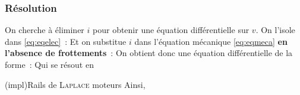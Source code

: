 \documentclass[../../main/main.tex]{subfiles}
\begin{document}
\subsubsection{Résolution}
\label{sssec:rlplmot_resol}
On cherche à éliminer $i$ pour obtenir une équation différentielle sur $v$. On
l'isole dans \eqref{eq:eqelec}~:
\psw{%
	\[
		i = \frac{U_0}{R} - \frac{B \ell }{R}v
	\]
}%
Et on substitue $i$ dans l'équation mécanique \eqref{eq:eqmeca} \textbf{en
	l'absence de frottements}~:
%
On obtient donc une équation différentielle de la forme~:
\psw{%
	\[
		\boxed{\dv{v}{t} + \frac{v}{\tau} = \frac{v\ind{lim}}{\tau}}
		\qav
		\boxed{\tau = \frac{Rm}{B^2 \ell ^{2}}}
		\qet
		\boxed{v\ind{lim} = \frac{U_0}{B \ell }}
	\]
}%
Qui se résout en
\psw{%
	\[
		\boxed{v(t) = v\ind{lim}\left( 1 - \exr^{-t/\tau} \right)}
		\Lra
		\boxed{i(t) = \frac{U_0}{R}\exr^{-t/\tau}}
	\]
}%
\begin{tcb*}(impl){Rails de \textsc{Laplace} moteurs}
	Ainsi, 
\end{tcb*}
\end{document}
